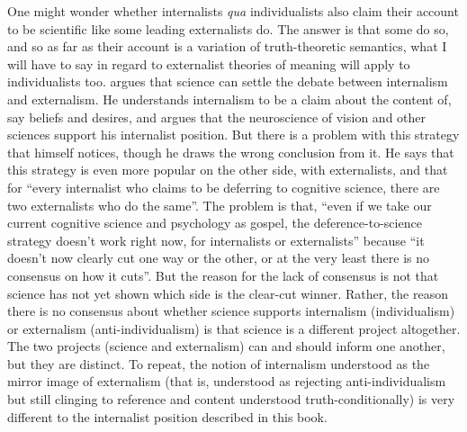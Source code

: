 One might wonder whether internalists \textit{qua} individualists also claim their account to be scientific like some leading externalists do. The answer is that some do so, and so as far as their account is a variation of truth-theoretic semantics, what I will have to say in regard to externalist theories of meaning will apply to individualists too. \citet{Mendola2008} argues that science can settle the debate between internalism and externalism. He understands internalism to be a claim about the content of, say beliefs and desires, and argues that the neuroscience of vision and other sciences support his internalist position. But there is a problem with this strategy that \citet[10]{Mendola2008} himself notices, though he draws the wrong conclusion from it. He says that this strategy is even more popular on the other side, with externalists, and that for “every internalist who claims to be deferring to cognitive science, there are two externalists who do the same”. The problem is that, “even if we take our current cognitive science and psychology as gospel, the deference-to-science strategy doesn’t work right now, for internalists or externalists” because “it doesn’t now clearly cut one way or the other, or at the very least there is no consensus on how it cuts”. But the reason for the lack of consensus is not that science has not yet shown which side is the clear-cut winner. Rather, the reason there is no consensus about whether science supports internalism (individualism) or externalism (anti-individualism) is that science is a different project altogether. The two projects (science and externalism) can and should inform one another, but they are distinct. To repeat, the notion of internalism understood as the mirror image of externalism (that is, understood as rejecting anti-individualism but still clinging to reference and content understood truth-conditionally) is very different to the internalist position described in this book.

